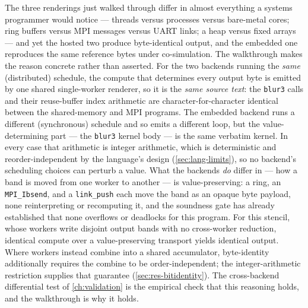The three renderings just walked through differ in almost everything a systems
programmer would notice --- threads versus processes versus bare-metal cores; ring
buffers versus MPI messages versus UART links; a heap versus fixed arrays --- and yet
the hosted two produce byte-identical output, and the embedded one reproduces the
same reference bytes under co-simulation. The walkthrough makes the reason concrete
rather than asserted. For the two backends running the \emph{same} (distributed)
schedule, the compute that determines every output byte is emitted by one shared
single-worker renderer, so it is the \emph{same source text}: the \texttt{blur3}
calls and their reuse-buffer index arithmetic are character-for-character identical
between the shared-memory and MPI programs. The embedded backend runs a different
(synchronous) schedule and so emits a different loop, but the value-determining part
--- the \texttt{blur3} kernel body --- is the same verbatim kernel. In every case that
arithmetic is integer arithmetic, which is deterministic and reorder-independent by
the language's design (\cref{sec:lang-limits}), so no backend's scheduling choices
can perturb a value. What the backends \emph{do} differ in --- how a band is moved from
one worker to another --- is value-preserving: a ring, an \texttt{MPI\_Ibsend}, and a
\texttt{link\_push} each move the band as an opaque byte payload, none reinterpreting
or recomputing it, and the soundness gate has already established that none overflows
or deadlocks for this program. For this stencil, whose workers write disjoint output
bands with no cross-worker reduction, identical compute over a value-preserving
transport yields identical output. Where workers instead combine into a shared
accumulator, byte-identity additionally requires the combine to be
order-independent; the integer-arithmetic restriction supplies that guarantee
(\cref{sec:res-bitidentity}). The
cross-backend differential test of \cref{ch:validation} is the
empirical check that this reasoning holds, and the walkthrough is why it holds.
